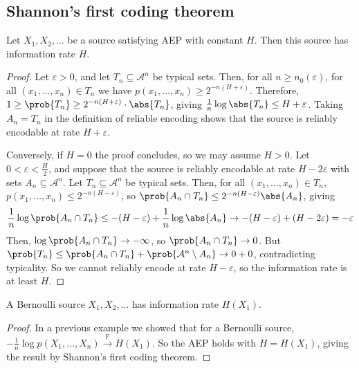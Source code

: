 \subsection{Shannon's first coding theorem}
\begin{theorem}
    Let $X_1, X_2, \dots$ be a source satisfying AEP with constant $H$.
    Then this source has information rate $H$.
\end{theorem}

\begin{proof}
    Let $\varepsilon > 0$, and let $T_n \subseteq \mathcal A^n$ be typical sets.
    Then, for all $n \geq n_0(\varepsilon)$, for all $(x_1, \dots, x_n) \in T_n$ we have $p(x_1, \dots, x_n) \geq 2^{-n(H + \varepsilon)}$.
    Therefore, $1 \geq \prob{T_n} \geq 2^{-n(H + \varepsilon)} \cdot \abs{T_n}$, giving $\frac{1}{n} \log \abs{T_n} \leq H + \varepsilon$.
    Taking $A_n = T_n$ in the definition of reliable encoding shows that the source is reliably encodable at rate $H + \varepsilon$.

    Conversely, if $H = 0$ the proof concludes, so we may assume $H > 0$.
    Let $0 < \varepsilon < \frac{H}{2}$, and suppose that the source is reliably encodable at rate $H - 2\varepsilon$ with sets $A_n \subseteq \mathcal A^n$.
    Let $T_n \subseteq \mathcal A^n$ be typical sets.
    Then, for all $(x_1, \dots, x_n) \in T_n$, $p(x_1, \dots, x_n) \leq 2^{-n(H - \varepsilon)}$, so $\prob{A_n \cap T_n} \leq 2^{-n(H - \varepsilon)} \abs{A_n}$, giving
    \begin{align*}
        \frac{1}{n} \log \prob{A_n \cap T_n} \leq -(H - \varepsilon) + \frac{1}{n} \log \abs{A_n} \to -(H - \varepsilon) + (H - 2 \varepsilon) = -\varepsilon
    \end{align*}
    Then, $\log \prob{A_n \cap T_n} \to -\infty$, so $\prob{A_n \cap T_n} \to 0$.
    But $\prob{T_n} \leq \prob{A_n \cap T_n} + \prob{\mathcal A^n \setminus A_n} \to 0 + 0$, contradicting typicality.
    So we cannot reliably encode at rate $H - \varepsilon$, so the information rate is at least $H$.
\end{proof}

\begin{corollary}
    A Bernoulli source $X_1, X_2, \dots$ has information rate $H(X_1)$.
\end{corollary}

\begin{proof}
    In a previous example we showed that for a Bernoulli source, \\ $-\frac{1}{n} \log p(X_1, \dots, X_n) \xrightarrow{\mathbb P} H(X_1)$.
    So the AEP holds with $H = H(X_1)$, giving the result by Shannon's first coding theorem.
\end{proof}

